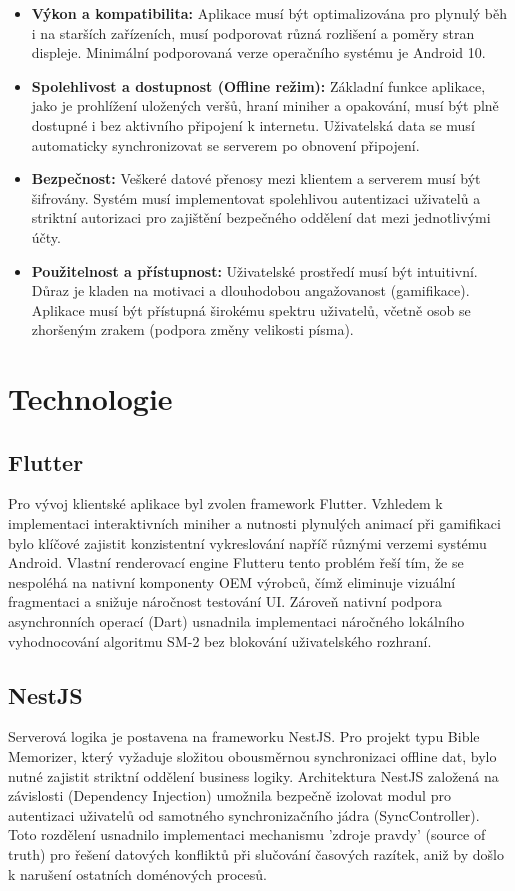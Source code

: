 \documentclass[12pt, a4paper, oneside]{article}
\begin{document}
	\begin{itemize}
		\item \textbf{Výkon a kompatibilita:} Aplikace musí být optimalizována pro plynulý běh i na starších zařízeních, musí podporovat různá rozlišení a poměry stran displeje. Minimální podporovaná verze operačního systému je Android 10.
		\item \textbf{Spolehlivost a dostupnost (Offline režim):} Základní funkce aplikace, jako je prohlížení uložených veršů, hraní miniher a opakování, musí být plně dostupné i bez aktivního připojení k internetu. Uživatelská data se musí automaticky synchronizovat se serverem po obnovení připojení.
		\item \textbf{Bezpečnost:} Veškeré datové přenosy mezi klientem a serverem musí být šifrovány. Systém musí implementovat spolehlivou autentizaci uživatelů a striktní autorizaci pro zajištění bezpečného oddělení dat mezi jednotlivými účty.
		\item \textbf{Použitelnost a přístupnost:} Uživatelské prostředí musí být intuitivní. Důraz je kladen na motivaci a dlouhodobou angažovanost (gamifikace). Aplikace musí být přístupná širokému spektru uživatelů, včetně osob se zhoršeným zrakem (podpora změny velikosti písma).
	\end{itemize}

	\newpage
	\section{Technologie}
	
	\subsection{Flutter}
 	Pro vývoj klientské aplikace byl zvolen framework Flutter. \cite{flutter} Vzhledem k implementaci interaktivních miniher a nutnosti plynulých animací při gamifikaci bylo klíčové zajistit konzistentní vykreslování napříč různými verzemi systému Android. Vlastní renderovací engine Flutteru tento problém řeší tím, že se nespoléhá na nativní komponenty OEM výrobců, čímž eliminuje vizuální fragmentaci a snižuje náročnost testování UI. Zároveň nativní podpora asynchronních operací (Dart) usnadnila implementaci náročného lokálního vyhodnocování algoritmu SM-2 bez blokování uživatelského rozhraní.
	
	\subsection{NestJS}
	Serverová logika je postavena na frameworku NestJS. \cite{nestjs} Pro projekt typu Bible Memorizer, který vyžaduje složitou obousměrnou synchronizaci offline dat, bylo nutné zajistit striktní oddělení business logiky. Architektura NestJS založená na závislosti (Dependency Injection) umožnila bezpečně izolovat modul pro autentizaci uživatelů od samotného synchronizačního jádra (SyncController). Toto rozdělení usnadnilo implementaci mechanismu 'zdroje pravdy' (source of truth) pro řešení datových konfliktů při slučování časových razítek, aniž by došlo k narušení ostatních doménových procesů.
	
\end{document}
